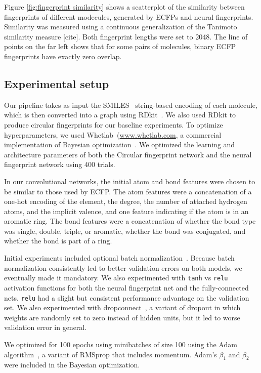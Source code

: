 \documentclass{article}
\begin{document}
Figure \ref{fig:fingerprint similarity} shows a scatterplot of the similarity between fingerprints of different modecules, generated by ECFPs and neural fingerprints.
Similarity was measured using a continuous generalization of the Tanimoto similarity measure [cite].
Both fingerprint lengths were set to 2048.
The line of points on the far left shows that for some pairs of molecules, binary ECFP fingerprints have exactly zero overlap.


\subsection{Experimental setup}

Our pipeline takes as input the SMILES~\citep{weininger1988smiles} string-based encoding of each molecule, which is then converted into a graph using RDkit~\citep{rdkit}.
We also used RDkit to produce circular fingerprints for our baseline experiments.
To optimize hyperparameters, we used Whetlab~(\url{www.whetlab.com}, a commercial implementation of Bayesian optimization~\citep{snoek2012practical}.
We optimized the learning and architecture parameters of both the Circular fingerprint network and the neural fingerprint network using 400 trials.

In our convolutional networks, the initial atom and bond features were chosen to be similar to those used by ECFP.
The atom features were a concatenation of a one-hot encoding of the element, the degree, the number of attached hydrogen atoms, and the implicit valence, and one feature indicating if the atom is in an aromatic ring. 
The bond features were a concatenation of whether the bond type was single, double, triple, or aromatic, whether the bond was conjugated, and whether the bond is part of a ring.

Initial experiments included optional batch normalization~\citep{ioffe2015batch}.
Because batch normalization consistently led to better validation errors on both models, we eventually made it mandatory.
We also experimented with \texttt{tanh} vs \texttt{relu} activation functions for both the neural fingerprint net and the fully-connected nets.  \texttt{relu} had a slight but consistent performance advantage on the validation set.
We also experimented with dropconnect~\citep{wan2013regularization}, a variant of dropout in which weights are randomly set to zero instead of hidden units, but it led to worse validation error in general.

We optimized for 100 epochs using minibatches of size 100 using the Adam algorithm~\citep{Adam14}, a variant of RMSprop that includes momentum.
Adam's $\beta_1$ and $\beta_2$ were included in the Bayesian optimization.
\end{document}
